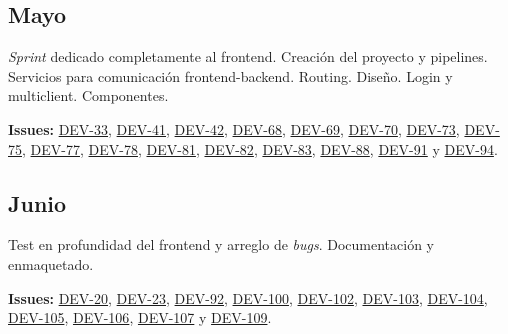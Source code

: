 \subsection{Mayo}
\textit{Sprint} dedicado completamente al frontend. Creación del proyecto y pipelines. Servicios para comunicación frontend-backend. Routing. Diseño. Login y multiclient. Componentes.

\bigskip
\textbf{Issues:} \href{https://github.com/harvestcore/tfg/issues/33}{DEV-33}, 
\href{https://github.com/harvestcore/tfg/issues/41}{DEV-41}, 
\href{https://github.com/harvestcore/tfg/issues/42}{DEV-42}, 
\href{https://github.com/harvestcore/tfg/issues/68}{DEV-68}, 
\href{https://github.com/harvestcore/tfg/issues/69}{DEV-69}, 
\href{https://github.com/harvestcore/tfg/issues/70}{DEV-70}, 
\href{https://github.com/harvestcore/tfg/issues/73}{DEV-73}, 
\href{https://github.com/harvestcore/tfg/issues/75}{DEV-75}, 
\href{https://github.com/harvestcore/tfg/issues/77}{DEV-77}, 
\href{https://github.com/harvestcore/tfg/issues/78}{DEV-78}, 
\href{https://github.com/harvestcore/tfg/issues/81}{DEV-81}, 
\href{https://github.com/harvestcore/tfg/issues/82}{DEV-82}, 
\href{https://github.com/harvestcore/tfg/issues/83}{DEV-83}, 
\href{https://github.com/harvestcore/tfg/issues/88}{DEV-88}, 
\href{https://github.com/harvestcore/tfg/issues/91}{DEV-91} y 
\href{https://github.com/harvestcore/tfg/issues/94}{DEV-94}.


\subsection{Junio}
Test en profundidad del frontend y arreglo de \textit{bugs}. Documentación y enmaquetado.

\bigskip
\textbf{Issues:} \href{https://github.com/harvestcore/tfg/issues/20}{DEV-20}, 
\href{https://github.com/harvestcore/tfg/issues/23}{DEV-23}, 
\href{https://github.com/harvestcore/tfg/issues/92}{DEV-92}, 
\href{https://github.com/harvestcore/tfg/issues/100}{DEV-100}, 
\href{https://github.com/harvestcore/tfg/issues/102}{DEV-102}, 
\href{https://github.com/harvestcore/tfg/issues/103}{DEV-103}, 
\href{https://github.com/harvestcore/tfg/issues/104}{DEV-104}, 
\href{https://github.com/harvestcore/tfg/issues/105}{DEV-105}, 
\href{https://github.com/harvestcore/tfg/issues/106}{DEV-106}, 
\href{https://github.com/harvestcore/tfg/issues/107}{DEV-107} y 
\href{https://github.com/harvestcore/tfg/issues/109}{DEV-109}.
